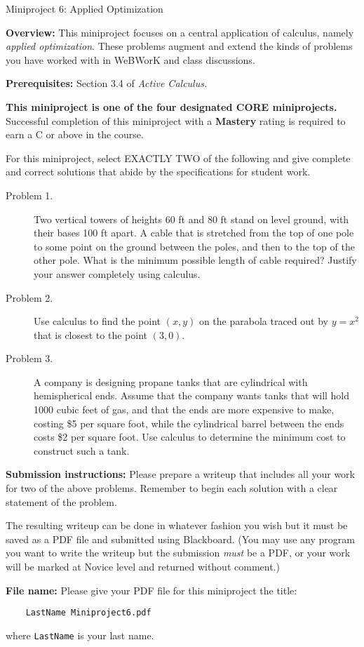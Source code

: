 \documentclass[11pt,letterpaper]{article}
\begin{document}
\begin{flushright}
	\begin{Large}
		Miniproject 6: Applied Optimization
	\end{Large}
\end{flushright}

\noindent
\textbf{Overview:} This miniproject focuses on a central application of calculus, namely \emph{applied optimization}. These problems augment and extend the kinds of problems you have worked with in WeBWorK and class discussions. 

\medskip

\noindent
\textbf{Prerequisites:} Section 3.4 of \emph{Active Calculus.}

\medskip

\noindent
\textbf{This miniproject is one of the four designated CORE miniprojects.} Successful completion of this miniproject with a \textbf{Mastery} rating is required to earn a C or above in the course. 
	

\hrulefill

For this miniproject, select EXACTLY TWO of the following and give complete and correct solutions that abide by the specifications for student work. 

\begin{description}
	\item[Problem 1.] Two vertical towers of heights 60 ft and 80 ft stand on level ground, with their bases 100 ft apart. A cable that is stretched from the top of one pole to some point on the ground between the poles, and then to the top of the other pole. What is the minimum possible length of cable required? Justify your answer completely using calculus.
	\item[Problem 2.] Use calculus to find the point $(x,y)$ on the parabola traced out by $y = x^2$ that is closest to the point $(3,0)$. 
	\item[Problem 3.] A company is designing propane tanks that are cylindrical with hemispherical ends. Assume that the company wants tanks that will hold 1000 cubic feet of gas, and that the ends are more expensive to make, costing \$5 per square foot, while the cylindrical barrel between the ends costs \$2 per square foot. Use calculus to determine the minimum cost to construct such a tank.
\end{description}


\hrulefill

\noindent
\textbf{Submission instructions:} Please prepare a writeup that includes all your work for two of the above problems. Remember to begin each solution with a clear statement of the problem. 

The resulting writeup can be done in whatever fashion you wish but it must be saved as a PDF file and submitted using Blackboard. (You may use any program you want to write the writeup but the submission \emph{must} be a PDF, or your work will be marked at Novice level and returned without comment.) 

\noindent
\textbf{File name:} Please give your PDF file for this miniproject the title: 
\begin{verbatim}
	LastName Miniproject6.pdf
\end{verbatim}
where \texttt{LastName} is your last name. 
\end{document}
